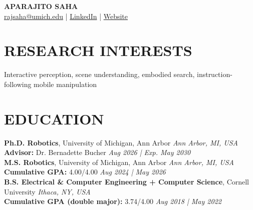 \documentclass[a4paper,9pt]{extarticle}
\begin{document}
\pagestyle{fancy}
\renewcommand{\headrulewidth}{0pt}
\fancyhead{}
\thispagestyle{empty} %

\begin{center}
\textbf{\Huge APARAJITO SAHA}\\[3pt] %
 \href{mailto:rajsaha@umich.edu}{rajsaha@umich.edu} | \href{https://www.linkedin.com/in/aparajitosaha}{LinkedIn} | \href{https://aparajitosaha.github.io}{Website} %
\end{center}

\section*{RESEARCH INTERESTS}
\noindent
Interactive perception, scene understanding, embodied search, instruction-following mobile manipulation

\section*{EDUCATION}
\noindent
\textbf{Ph.D. Robotics}, University of Michigan, Ann Arbor \hfill   \textit{Ann Arbor, MI, USA} \\ %
\textbf{Advisor:} Dr. Bernadette Bucher \hfill \textit{Aug 2026 | Exp. May 2030} \\ %

\noindent
\textbf{M.S. Robotics}, University of Michigan, Ann Arbor \hfill   \textit{Ann Arbor, MI, USA} \\ %
\textbf{Cumulative GPA:} 4.00/4.00 \hfill \textit{Aug 2024 | May 2026} \\ %

\noindent
\textbf{B.S. Electrical \& Computer Engineering + Computer Science}, Cornell University \hfill   \textit{Ithaca, NY, USA} \\ %
\textbf{Cumulative GPA (double major):} 3.74/4.00 \hfill \textit{Aug 2018 | May 2022}  %

\end{document}
